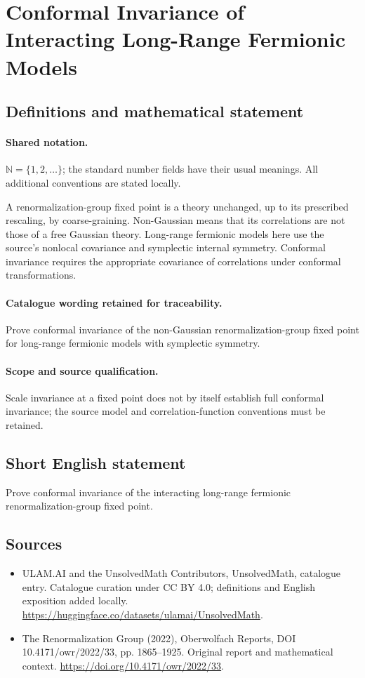 \documentclass[11pt]{article}
\begin{document}
\section{Conformal Invariance of Interacting Long-Range Fermionic Models}\label{statement}

\subsection{Definitions and mathematical statement}

\paragraph{Shared notation.}$\mathbb N=\{1,2,\ldots\}$; the standard number fields have their usual meanings. All additional conventions are stated locally.


A renormalization-group fixed point is a theory unchanged, up to its prescribed rescaling, by coarse-graining. Non-Gaussian means that its correlations are not those of a free Gaussian theory. Long-range fermionic models here use the source's nonlocal covariance and symplectic internal symmetry. Conformal invariance requires the appropriate covariance of correlations under conformal transformations.

\paragraph{Catalogue wording retained for traceability.}
Prove conformal invariance of the non-Gaussian renormalization-group fixed point for long-range fermionic models with symplectic symmetry.

\paragraph{Scope and source qualification.}Scale invariance at a fixed point does not by itself establish full conformal invariance; the source model and correlation-function conventions must be retained.
\subsection{Short English statement}
Prove conformal invariance of the interacting long-range fermionic renormalization-group fixed point.
\subsection{Sources}
\begin{itemize}
\item[\hypertarget{source:statement:1}{S1}] ULAM.AI and the UnsolvedMath Contributors, UnsolvedMath, catalogue entry. Catalogue curation under CC BY 4.0; definitions and English exposition added locally.
\url{https://huggingface.co/datasets/ulamai/UnsolvedMath}.
\item[\hypertarget{source:statement:2}{S2}] The Renormalization Group (2022), Oberwolfach Reports, DOI 10.4171/owr/2022/33, pp. 1865--1925. Original report and mathematical context.
\url{https://doi.org/10.4171/owr/2022/33}.
\end{itemize}
\label{end:statement}
\end{document}
